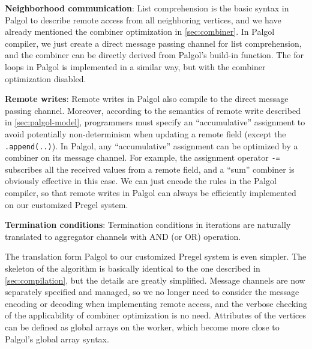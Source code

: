 \documentclass{sokendai_thesis} %
\begin{document}
\textbf{Neighborhood communication}: List comprehension is the basic syntax in Palgol to describe remote access from all neighboring vertices, and we have already mentioned the combiner optimization in \autoref{sec:combiner}.
In Palgol compiler, we just create a direct message passing channel for list comprehension, and the combiner can be directly derived from Palgol's build-in function.
The for loops in Palgol is implemented in a similar way, but with the combiner optimization disabled.

\textbf{Remote writes}: Remote writes in Palgol also compile to the direct message passing channel.
Moreover, according to the semantics of remote write described in \autoref{sec:palgol-model}, programmers must specify an ``accumulative'' assignment to avoid potentially non-determinism when updating a remote field (except the \texttt{.append(..)}).
In Palgol, any ``accumulative'' assignment can be optimized by a combiner on its message channel.
For example, the assignment operator \texttt{-=} subscribes all the received values from a remote field, and a ``sum'' combiner is obviously effective in this case.
We can just encode the rules in the Palgol compiler, so that remote writes in Palgol can always be efficiently implemented on our customized Pregel system.

\textbf{Termination conditions}: Termination conditions in iterations are naturally translated to aggregator channels with AND (or OR) operation.

The translation form Palgol to our customized Pregel system is even simpler.
The skeleton of the algorithm is basically identical to the one described in \autoref{sec:compilation}, but the details are greatly simplified.
Message channels are now separately specified and managed, so we no longer need to consider the message encoding or decoding when implementing remote access, and the verbose checking of the applicability of combiner optimization is no need.
Attributes of the vertices can be defined as global arrays on the worker, which become more close to Palgol's global array syntax.


\end{document}
